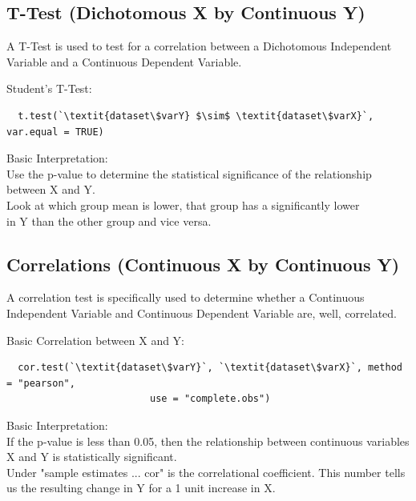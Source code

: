\documentclass[12pt,letterpaper]{article}
\newcommand{\ind}{\phantom{AA}}
\begin{document}
\subsection{T-Test (Dichotomous X by Continuous Y)}
A T-Test is used to test for a correlation between a Dichotomous Independent Variable and a Continuous Dependent Variable.
\begin{tcolorbox}[title = T-Test (Dichotomous X by Continuous Y)]
Student's T-Test:
\begin{lstlisting}
  t.test(`\textit{dataset\$varY} $\sim$ \textit{dataset\$varX}`, var.equal = TRUE)
\end{lstlisting}
Basic Interpretation:\\
\ind Use the p-value to determine the statistical significance of the relationship \\ \ind \ind between X and Y.\\
\ind Look at which group mean is lower, that group has a significantly lower \\ \ind \ind in Y than the other group and vice versa.
\end{tcolorbox}

\vspace{-.75em}

\subsection{Correlations (Continuous X by Continuous Y)}
A correlation test is specifically used to determine whether a Continuous Independent Variable and Continuous Dependent Variable are, well, correlated.
\begin{tcolorbox}[title = Correlations (Continuous X by Continuous Y)]
Basic Correlation between X and Y:
\begin{lstlisting}
  cor.test(`\textit{dataset\$varY}`, `\textit{dataset\$varX}`, method = "pearson", 
	  				     use = "complete.obs")
\end{lstlisting}
\end{tcolorbox}
\begin{tcolorbox}[title = Correlations (Continuous X by Continuous Y)(cont.)]
Basic Interpretation: \\
\ind If the p-value is less than 0.05, then the relationship between continuous variables \ind \ind X and Y is statistically significant.\\
\ind Under "sample estimates ... cor" is the correlational coefficient. This number \ind \ind tells us the resulting change in Y for a 1 unit increase in X.
\end{tcolorbox}
\end{document}
